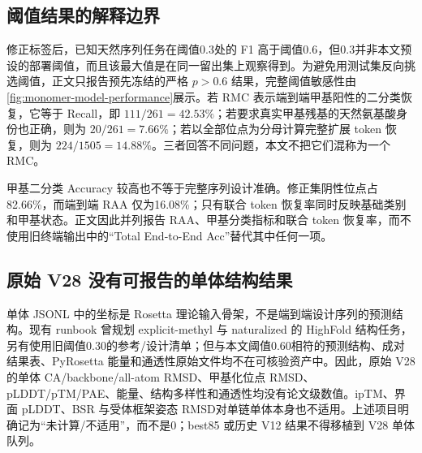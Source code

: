 \subsection{阈值结果的解释边界}

修正标签后，已知天然序列任务在阈值0.3处的 F1 高于阈值0.6，但0.3并非本文预设的部署阈值，而且该最大值是在同一留出集上观察得到。为避免用测试集反向挑选阈值，正文只报告预先冻结的严格 $p>0.6$ 结果，完整阈值敏感性由\cref{fig:monomer-model-performance}展示。若 RMC 表示端到端甲基阳性的二分类恢复，它等于 Recall，即 $111/261=42.53\%$；若要求真实甲基残基的天然氨基酸身份也正确，则为 $20/261=7.66\%$；若以全部位点为分母计算完整扩展 token 恢复，则为 $224/1505=14.88\%$。三者回答不同问题，本文不把它们混称为一个 RMC。

甲基二分类 Accuracy 较高也不等于完整序列设计准确。修正集阴性位点占82.66\%，而端到端 RAA 仅为16.08\%；只有联合 token 恢复率同时反映基础类别和甲基状态。正文因此并列报告 RAA、甲基分类指标和联合 token 恢复率，而不使用旧终端输出中的“Total End-to-End Acc”替代其中任何一项。

\subsection{原始 V28 没有可报告的单体结构结果}

单体 JSONL 中的坐标是 Rosetta 理论输入骨架，不是端到端设计序列的预测结构。现有 runbook 曾规划 explicit-methyl 与 naturalized 的 HighFold 结构任务，另有使用旧阈值0.30的参考/设计清单；但与本文阈值0.60相符的预测结构、成对结果表、PyRosetta 能量和通透性原始文件均不在可核验资产中。因此，原始 V28 的单体 CA/backbone/all-atom RMSD、甲基化位点 RMSD、pLDDT/pTM/PAE、能量、结构多样性和通透性均没有论文级数值。ipTM、界面 pLDDT、BSR 与受体框架姿态 RMSD对单链单体本身也不适用。上述项目明确记为“未计算/不适用”，而不是0；best85 或历史 V12 结果不得移植到 V28 单体队列。

